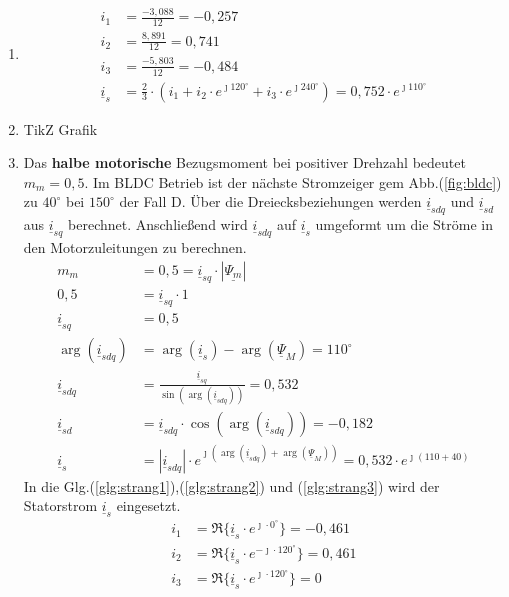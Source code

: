 \begin{solution}
\begin{enumerate}
\item
\begin{align}
i_1 &= \frac{-3,088}{12} = -0,257\\
i_2 &= \frac{8,891}{12} = 0,741\\
i_3 &= \frac{-5,803}{12} = -0,484\\
\underline{i}_s &= \frac{2}{3} \cdot ( i_1 + i_2 \cdot e^{\jmath 120 ^\circ} + i_3 \cdot e^{\jmath 240 ^\circ}) = 0,752 \cdot e^{\jmath 110^\circ}
\end{align}
\item TikZ Grafik
\item Das \textbf{halbe motorische} Bezugsmoment bei positiver Drehzahl bedeutet $m_m = 0,5$. Im BLDC Betrieb ist der nächste Stromzeiger gem Abb.(\ref{fig:bldc}) zu $40^\circ$ bei $150^\circ$ der Fall D. Über die Dreiecksbeziehungen werden $\underline{i}_{sdq}$ und $\underline{i}_{sd}$ aus $\underline{i}_{sq}$ berechnet. Anschließend wird $\underline{i}_{sdq}$ auf $\underline{i}_{s}$ umgeformt um die Ströme in den Motorzuleitungen zu berechnen.
\begin{align}
m_m &= 0,5 = \underline{i}_{sq} \cdot |\underline{\Psi_m}|\\
0,5&= \underline{i}_{sq} \cdot 1\\
\underline{i}_{sq} &= 0,5\\
\arg(\underline{i}_{sdq}) &= \arg(\underline{i}_{s}) -\arg(\underline{\Psi}_{M})=110^\circ\\
\underline{i}_{sdq} &= \frac{\underline{i}_{sq}}{\sin(\arg(\underline{i}_{sdq}))}= 0,532\\
\underline{i}_{sd} &= \underline{i}_{sdq} \cdot \cos(\arg(\underline{i}_{sdq})) = -0,182\\
\underline{i}_{s} &= |\underline{i}_{sdq}| \cdot e^{\jmath (\arg(\underline{i}_{sdq}) + \arg(\underline{\Psi}_{M}))}= 0,532 \cdot e^{\jmath ( 110 + 40)}
\end{align}
In die Glg.(\ref{glg:strang1}),(\ref{glg:strang2}) und (\ref{glg:strang3}) wird der Statorstrom $\underline{i}_s$ eingesetzt.
\begin{align}
i_1 & = \Re \{ \underline{i}_s \cdot e^{\jmath \cdot 0 ^\circ} \} = -0,461\\
i_2 & = \Re \{ \underline{i}_s \cdot e^{-\jmath \cdot 120 ^\circ} \} = 0,461 \\
i_3 & = \Re \{ \underline{i}_s \cdot e^{\jmath \cdot 120 ^\circ} \}=  0
\end{align}

\end{enumerate}
\end{solution}
